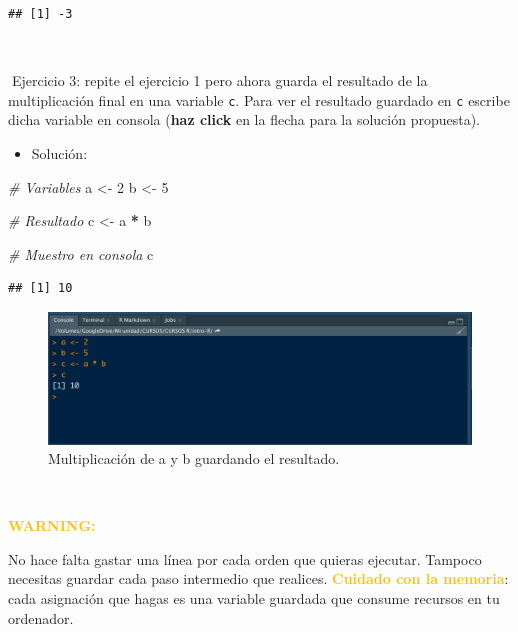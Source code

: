 \documentclass[11pt,]{book}
\newenvironment{Shaded}{\begin{snugshade}}{\end{snugshade}}
\newcommand{\CommentTok}[1]{\textcolor[rgb]{0.37,0.37,0.37}{\textit{#1}}}
\newcommand{\DecValTok}[1]{\textcolor[rgb]{0.06,0.06,0.06}{#1}}
\newcommand{\NormalTok}[1]{#1}
\newcommand{\OperatorTok}[1]{\textcolor[rgb]{0.43,0.43,0.43}{\textbf{#1}}}
\newcommand{\StringTok}[1]{\textcolor[rgb]{0.5,0.5,0.5}{#1}}
\providecommand{\tightlist}{%
  \setlength{\itemsep}{0pt}\setlength{\parskip}{0pt}}
\begin{document}
\begin{verbatim}
## [1] -3
\end{verbatim}

~

📝Ejercicio 3: repite el ejercicio 1 pero ahora guarda el resultado de la multiplicación final en una variable \texttt{c}. Para ver el resultado guardado en \texttt{c} escribe dicha variable en consola (\textbf{haz click} en la flecha para la solución propuesta).

\begin{itemize}
\tightlist
\item
  Solución:
\end{itemize}

\begin{Shaded}
\begin{Highlighting}[]
\CommentTok{# Variables}
\NormalTok{a <-}\StringTok{ }\DecValTok{2}
\NormalTok{b <-}\StringTok{ }\DecValTok{5}

\CommentTok{# Resultado}
\NormalTok{c <-}\StringTok{ }\NormalTok{a }\OperatorTok{*}\StringTok{ }\NormalTok{b}

\CommentTok{# Muestro en consola}
\NormalTok{c}
\end{Highlighting}
\end{Shaded}

\begin{verbatim}
## [1] 10
\end{verbatim}

\begin{figure}

{\centering \includegraphics[width=0.8\linewidth]{./img/consola_multiplicacion_2} 

}

\caption{Multiplicación de a y b guardando el resultado.}\label{fig:unnamed-chunk-8}
\end{figure}

~

\textbf{\textcolor{#ffc107}{WARNING:}}

No hace falta gastar una línea por cada orden que quieras ejecutar. Tampoco necesitas guardar cada paso intermedio que realices. \textbf{\textcolor{#ffc107}{Cuidado con la memoria}}: cada asignación que hagas es una variable guardada que consume recursos en tu ordenador.
\end{document}
